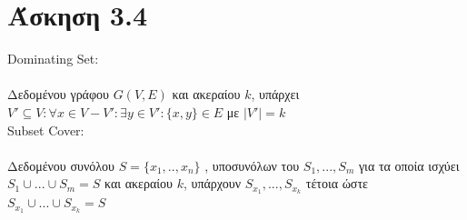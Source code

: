 \documentclass{article}
\begin{document}
\section{Άσκηση 3.4}
Dominating Set:\\
\\
Δεδομένου γράφου $G(V,E)$ και ακεραίου $k$, υπάρχει $V' \subseteq V : \forall x \in V - V' : \exists y \in V' : \{x,y\} \in E$ με $|V'| = k$\\

Subset Cover:\\
\\
Δεδομένου συνόλου $S = \{x_1,..,x_n\}$ 
, υποσυνόλων του $S_1,...,S_m$ για τα οποία ισχύει $ S_{1} \cup ... \cup S_{m} = S $  
και ακεραίου $k$, υπάρχουν
$S_{x_1} ,..., S_{x_k}$ τέτοια ώστε
 $S_{x_1} \cup ... \cup S_{x_k} = S $ \\
\end{document}
